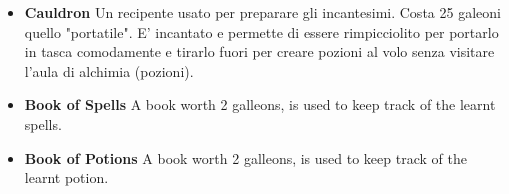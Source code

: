 
\begin{itemize}
    \item \textbf {Cauldron} 
 Un recipente usato per preparare gli incantesimi. Costa 25 galeoni quello "portatile". E' incantato e permette di essere rimpicciolito per portarlo in tasca comodamente e tirarlo fuori per creare pozioni al volo senza visitare l'aula di alchimia (pozioni).
 
   \item \textbf{Book of Spells }   
A book worth 2 galleons, is used to keep track of the learnt spells.
   
 \item \textbf{Book of Potions}
 A book worth 2 galleons, is used to keep track of the learnt potion.
\end{itemize}
\pagebreak

